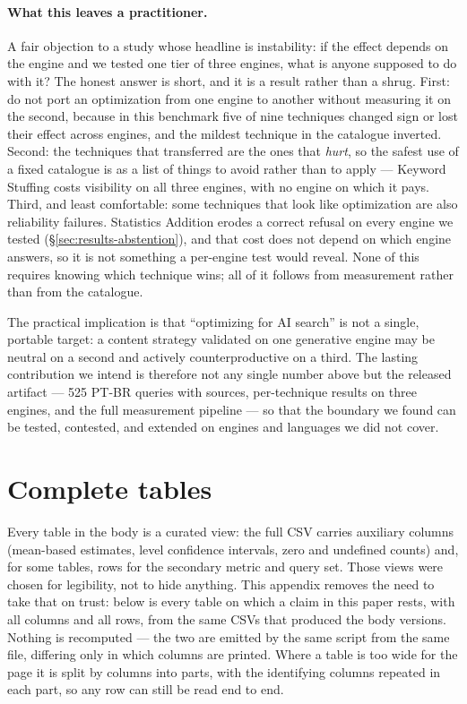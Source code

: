 \documentclass[11pt,a4paper]{article}
\begin{document}
\paragraph{What this leaves a practitioner.} A fair objection to a study
whose headline is instability: if the effect depends on the engine and we
tested one tier of three engines, what is anyone supposed to do with it? The
honest answer is short, and it is a result rather than a shrug. First: do
not port an optimization from one engine to another without measuring it on
the second, because in this benchmark five of nine techniques changed sign
or lost their effect across engines, and the mildest technique in the
catalogue inverted. Second: the techniques that transferred are the ones
that \emph{hurt}, so the safest use of a fixed catalogue is as a list of
things to avoid rather than to apply --- Keyword Stuffing costs visibility
on all three engines, with no engine on which it pays. Third, and least
comfortable: some techniques that look like optimization are also
reliability failures. Statistics Addition erodes a correct refusal on every
engine we tested (\S\ref{sec:results-abstention}), and that cost does not
depend on which engine answers, so it is not something a per-engine test
would reveal. None of this requires knowing which technique wins; all of it
follows from measurement rather than from the catalogue.

The practical implication is that ``optimizing for AI search'' is not a
single, portable target: a content strategy validated on one generative
engine may be neutral on a second and actively counterproductive on a
third. The lasting contribution we intend is therefore not any single
number above but the released artifact --- 525 PT-BR queries with sources,
per-technique results on three engines, and the full measurement pipeline
--- so that the boundary we found can be tested, contested, and extended on
engines and languages we did not cover.

\appendix
\section{Complete tables}
\label{sec:appendix-tables}

Every table in the body is a curated view: the full CSV carries auxiliary
columns (mean-based estimates, level confidence intervals, zero and
undefined counts) and, for some tables, rows for the secondary metric and
query set. Those views were chosen for legibility, not to hide anything.
This appendix removes the need to take that on trust: below is every table
on which a claim in this paper rests, with all columns and all rows, from
the same CSVs that produced the body versions. Nothing is recomputed --- the
two are emitted by the same script from the same file, differing only in
which columns are printed. Where a table is too wide for the page it is
split by columns into parts, with the identifying columns repeated in each
part, so any row can still be read end to end.
\end{document}
